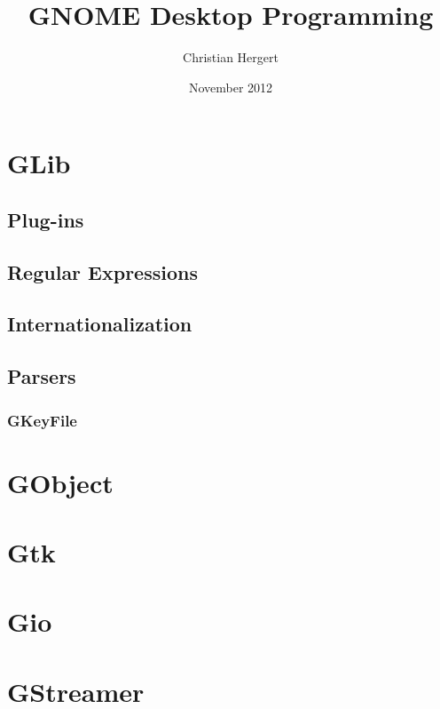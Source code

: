 

\title{
    GNOME Desktop Programming
}
\author{Christian Hergert}
\date{November 2012}

\frontmatter
\maketitle
\tableofcontents


\mainmatter
\part{GLib}










\chapter{Plug-ins}
\chapter{Regular Expressions}
\chapter{Internationalization}
\chapter{Parsers}
\section{GKeyFile}
\part{GObject}
\part{Gtk}
\part{Gio}
\part{GStreamer}
\appendix

